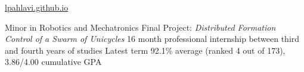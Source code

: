 \documentclass{ResumeTemplate}
\begin{document}
	
	
	{\href{https://lpahlavi.github.io}{lpahlavi.github.io}}
	~\newline\newline
	
	\begin{tcolorbox}[colback=blue!5!white,colframe=blue!75!black,title=EDUCATION]
	
	\workitemsfour
	{Minor in Robotics and Mechatronics}
	{Final Project: \textit{Distributed Formation Control of a Swarm of Unicycles}}
	{16 month professional internship between third and fourth years of studies}
	{Latest term 92.1\% average (ranked 4 out of 173), 3.86/4.00 cumulative GPA}
	~
	\end{tcolorbox}
	
\end{document}
